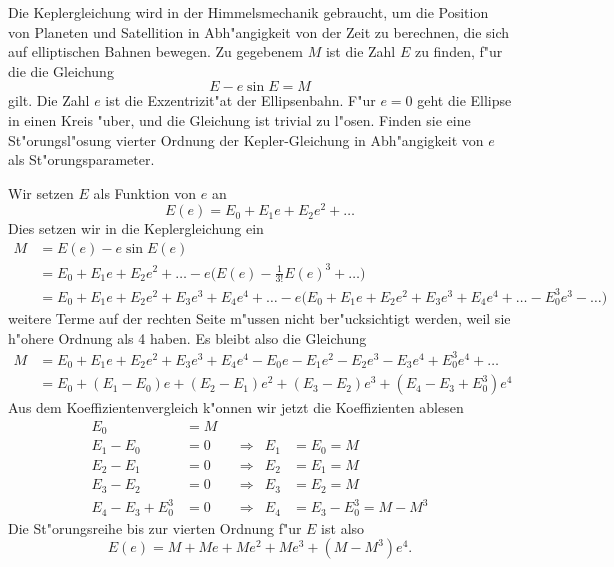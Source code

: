 Die Keplergleichung wird in der Himmelsmechanik gebraucht, um die 
Position von Planeten und Satellition in Abh"angigkeit von der Zeit
zu berechnen, die sich auf elliptischen Bahnen bewegen.
Zu gegebenem $M$ ist die Zahl $E$ zu finden, f"ur die die Gleichung
\[
E-e\sin E=M
\]
gilt.
Die Zahl $e$ ist die Exzentrizit"at der Ellipsenbahn. F"ur $e=0$
geht die Ellipse in einen Kreis "uber, und die Gleichung ist trivial
zu l"osen. Finden sie eine St"orungsl"osung vierter Ordnung
der Kepler-Gleichung in Abh"angigkeit von $e$ als St"orungsparameter.

\begin{loesung}
Wir setzen $E$ als Funktion von $e$ an
\[
E(e)
=
E_0+E_1e+E_2e^2+\dots
\]
Dies setzen wir in die Keplergleichung ein
\begin{align*}
M
&=
E(e)-e\sin E(e)
\\
&=
E_0+E_1e+E_2e^2+\dots
-e\biggl(
E(e)-\frac1{3!}E(e)^3+\dots
\biggr)
\\
&=
E_0+E_1e+E_2e^2+E_3e^3+E_4e^4+\dots
-e\biggl(
E_0+E_1e+E_2e^2+E_3e^3+E_4e^4+\dots
-E_0^3e^3-\dots
\biggr)
\end{align*}
weitere Terme auf der rechten Seite m"ussen nicht ber"ucksichtigt
werden, weil sie h"ohere Ordnung als 4 haben.
Es bleibt also die Gleichung
\begin{align*}
M
&=
E_0+E_1e+E_2e^2+E_3e^3+E_4e^4
-E_0e-E_1e^2-E_2e^3-E_3e^4
+E_0^3e^4+\dots
\\
&=
E_0
+(E_1-E_0)e
+(E_2-E_1)e^2
+(E_3-E_2)e^3
+(E_4-E_3+E_0^3)e^4
\end{align*}
Aus dem Koeffizientenvergleich k"onnen wir jetzt die Koeffizienten ablesen
\begin{equation}
\begin{aligned}
E_0&=M
\\
E_1-E_0&=0&&\Rightarrow&E_1&=E_0=M\\
E_2-E_1&=0&&\Rightarrow&E_2&=E_1=M\\
E_3-E_2&=0&&\Rightarrow&E_3&=E_2=M\\
E_4-E_3+E_0^3&=0&&\Rightarrow&E_4&=E_3-E_0^3=M-M^3
\end{aligned}
\end{equation}
Die St"orungsreihe bis zur vierten Ordnung f"ur $E$ ist also
\[
E(e)=M+Me+Me^2+Me^3+(M-M^3)e^4.
\]
\begin{figure}
\centering

\end{figure}
\end{loesung}
